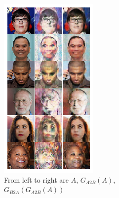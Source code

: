 \documentclass[10pt,twocolumn,letterpaper]{article}
\begin{document}
\begin{figure}[h]
   \centering
   \begin{subfigure}{.48\linewidth}
      \centering
      \includegraphics[width=.7\linewidth]{cycle-result-source.png}
      \caption{From left to right are $A$, $G_{A2B}(A)$, $G_{B2A}(G_{A2B}(A))$}
   \end{subfigure}
   \begin{subfigure}{.48\linewidth}
      \centering

\end{subfigure}
\end{figure}
\end{document}
